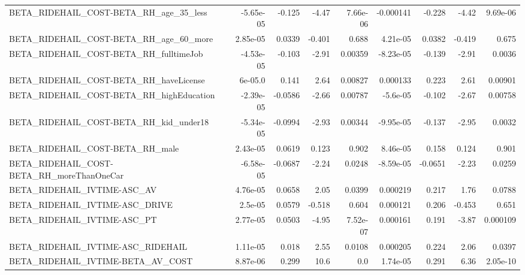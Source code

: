 \begin{tabular}{lrrrrrrrr}
BETA\_RIDEHAIL\_COST-BETA\_RH\_age\_35\_less             &   -5.65e-05 &       -0.125 &    -4.47 & 7.66e-06 &  -0.000141 &      -0.228 &        -4.42 &      9.69e-06 \\
BETA\_RIDEHAIL\_COST-BETA\_RH\_age\_60\_more             &    2.85e-05 &       0.0339 &   -0.401 &    0.688 &   4.21e-05 &      0.0382 &       -0.419 &         0.675 \\
BETA\_RIDEHAIL\_COST-BETA\_RH\_fulltimeJob             &   -4.53e-05 &       -0.103 &    -2.91 &  0.00359 &  -8.23e-05 &      -0.139 &        -2.91 &        0.0036 \\
BETA\_RIDEHAIL\_COST-BETA\_RH\_haveLicense             &     6e-05.0 &        0.141 &     2.64 &  0.00827 &   0.000133 &       0.223 &         2.61 &       0.00901 \\
BETA\_RIDEHAIL\_COST-BETA\_RH\_highEducation           &   -2.39e-05 &      -0.0586 &    -2.66 &  0.00787 &   -5.6e-05 &      -0.102 &        -2.67 &       0.00758 \\
BETA\_RIDEHAIL\_COST-BETA\_RH\_kid\_under18             &   -5.34e-05 &      -0.0994 &    -2.93 &  0.00344 &  -9.95e-05 &      -0.137 &        -2.95 &        0.0032 \\
BETA\_RIDEHAIL\_COST-BETA\_RH\_male                    &    2.43e-05 &       0.0619 &    0.123 &    0.902 &   8.46e-05 &       0.158 &        0.124 &         0.901 \\
BETA\_RIDEHAIL\_COST-BETA\_RH\_moreThanOneCar          &   -6.58e-05 &      -0.0687 &    -2.24 &   0.0248 &  -8.59e-05 &     -0.0651 &        -2.23 &        0.0259 \\
BETA\_RIDEHAIL\_IVTIME-ASC\_AV                        &    4.76e-05 &       0.0658 &     2.05 &   0.0399 &   0.000219 &       0.217 &         1.76 &        0.0788 \\
BETA\_RIDEHAIL\_IVTIME-ASC\_DRIVE                     &     2.5e-05 &       0.0579 &   -0.518 &    0.604 &   0.000121 &       0.206 &       -0.453 &         0.651 \\
BETA\_RIDEHAIL\_IVTIME-ASC\_PT                        &    2.77e-05 &       0.0503 &    -4.95 & 7.52e-07 &   0.000161 &       0.191 &        -3.87 &      0.000109 \\
BETA\_RIDEHAIL\_IVTIME-ASC\_RIDEHAIL                  &    1.11e-05 &        0.018 &     2.55 &   0.0108 &   0.000205 &       0.224 &         2.06 &        0.0397 \\
BETA\_RIDEHAIL\_IVTIME-BETA\_AV\_COST                  &    8.87e-06 &        0.299 &     10.6 &      0.0 &   1.74e-05 &       0.291 &         6.36 &      2.05e-10 \\

\end{tabular}

